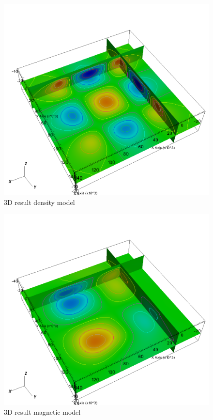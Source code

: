 \begin{figure}
\centering
\includegraphics[width=\textwidth]{joint3D4mag6grav-g.png}
\caption{3D result density model}
\label{fig:joint3D4mag6grav-g}
\end{figure}


\begin{figure}
\centering
\includegraphics[width=\textwidth]{joint3D4mag6grav-m.png}
\caption{3D result magnetic model}
\label{fig:joint3D4mag6grav-m}
\end{figure}

